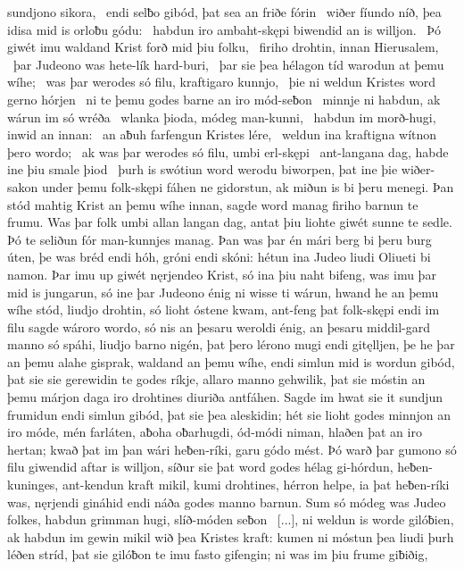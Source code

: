 sundjono sikora, \hld\ endi selƀo gibód,
þat sea an friðe fórin \hld\ wiðer fíundo níð,
þea idisa mid is orloƀu gódu: \hld\ habdun iro ambaht-skępi
biwendid an is willjon. \hld\ Þó giwét imu waldand Krist
forð mid þiu folku, \hld\ firiho drohtin,
innan Hierusalem, \hld\ þar Judeono was
hete-lík hard-buri, \hld\ þar sie þea hélagon tíd
warodun at þemu wíhe; \hld\ was þar werodes só filu,
kraftigaro kunnjo, \hld\ þie ni weldun Kristes word
gerno hórjen \hld\ ni te þemu godes barne
an iro mód-seƀon \hld\ minnje ni habdun,
ak wárun im só wréða \hld\ wlanka þioda,
módeg man-kunni, \hld\ habdun im morð-hugi,
inwid an innan: \hld\ an aƀuh farfengun
Kristes lére, \hld\ weldun ina kraftigna
wítnon þero wordo; \hld\ ak was þar werodes só filu,
umbi erl-skępi \hld\ ant-langana dag,
habde ine þiu smale þiod \hld\ þurh is swótiun word
werodu biworpen, þat ine þie wiðer-sakon
under þemu folk-skępi fáhen ne gidorstun,
ak miðun is bi þeru menegi. Þan stód mahtig Krist
an þemu wíhe innan, sagde word manag
firiho barnun te frumu. Was þar folk umbi
allan langan dag, antat þiu liohte giwét
sunne te sedle. Þó te seliðun fór
man-kunnjes manag. Þan was þar én mári berg
bi þeru burg úten, þe was bréd endi hóh,
gróni endi skóni: hétun ina Judeo liudi
Oliueti bi namon. Þar imu up giwét
nęrjendeo Krist, só ina þiu naht bifeng,
was imu þar mid is jungarun, só ine þar Judeono énig
ni wisse ti wárun, hwand he an þemu wíhe stód,
liudjo drohtin, só lioht óstene kwam,
ant-feng þat folk-skępi endi im filu sagde
wároro wordo, só nis an þesaru weroldi énig,
an þesaru middil-gard manno só spáhi,
liudjo barno nigén, þat þero lérono mugi
endi gitęlljen, þe he þar an þemu alahe gisprak,
waldand an þemu wíhe, endi simlun mid is wordun gibód,
þat sie sie gerewidin te godes ríkje,
allaro manno gehwilik, þat sie móstin an þemu márjon daga
iro drohtines diuriða antfáhen.
Sagde im hwat sie it sundjun frumidun endi simlun gibód,
þat sie þea aleskidin; hét sie lioht godes
minnjon an iro móde, mén farláten,
aƀoha oƀarhugdi, ód-módi niman,
hlaðen þat an iro hertan; kwað þat im þan wári heƀen-ríki,
garu gódo mést. Þó warð þar gumono só filu
giwendid aftar is willjon, síður sie þat word godes
hélag gi-hórdun, heƀen-kuninges,
ant-kendun kraft mikil, kumi drohtines,
hérron helpe, ia þat heƀen-ríki was,
nęrjendi gináhid endi náða godes
manno barnun. Sum só módeg was
Judeo folkes, habdun grimman hugi,
slíð-móden seƀon \hld\ [...],
ni weldun is worde gilóƀien, ak habdun im gewin mikil
wið þea Kristes kraft: kumen ni móstun
þea liudi þurh léðen stríd, þat sie gilóƀon te imu
fasto gifengin; ni was im þiu frume giƀiðig,
